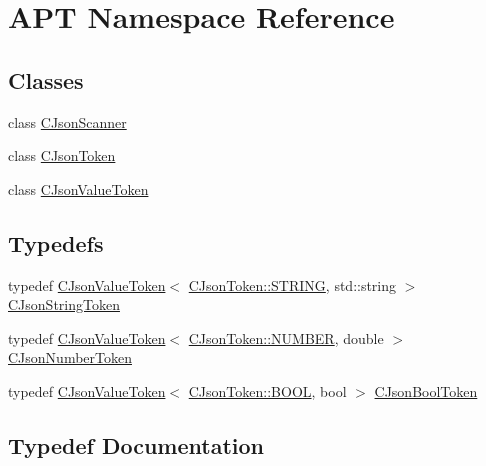\hypertarget{namespaceAPT}{}\section{A\+PT Namespace Reference}
\label{namespaceAPT}
\subsection*{Classes}
\begin{DoxyCompactItemize}
\item 
class \hyperlink{classAPT_1_1CJsonScanner}{C\+Json\+Scanner}
\item 
class \hyperlink{classAPT_1_1CJsonToken}{C\+Json\+Token}
\item 
class \hyperlink{classAPT_1_1CJsonValueToken}{C\+Json\+Value\+Token}
\end{DoxyCompactItemize}
\subsection*{Typedefs}
\begin{DoxyCompactItemize}
\item 
typedef \hyperlink{classAPT_1_1CJsonValueToken}{C\+Json\+Value\+Token}$<$ \hyperlink{classAPT_1_1CJsonToken_aab8edca6cac7d6c2cd4cb37ea0ab0dceab38d27c8c3b0aa088ce14682895b19d0}{C\+Json\+Token\+::\+S\+T\+R\+I\+NG}, std\+::string $>$ \hyperlink{namespaceAPT_a3af7abde9f907425ef65954a9b102083}{C\+Json\+String\+Token}
\item 
typedef \hyperlink{classAPT_1_1CJsonValueToken}{C\+Json\+Value\+Token}$<$ \hyperlink{classAPT_1_1CJsonToken_aab8edca6cac7d6c2cd4cb37ea0ab0dcea3113bd34020b4bff6e98c04ebc59cf1f}{C\+Json\+Token\+::\+N\+U\+M\+B\+ER}, double $>$ \hyperlink{namespaceAPT_aacc16da16d083aefa789bc0198b3effd}{C\+Json\+Number\+Token}
\item 
typedef \hyperlink{classAPT_1_1CJsonValueToken}{C\+Json\+Value\+Token}$<$ \hyperlink{classAPT_1_1CJsonToken_aab8edca6cac7d6c2cd4cb37ea0ab0dceabee35e13f6e1392c313da66ffe95564e}{C\+Json\+Token\+::\+B\+O\+OL}, bool $>$ \hyperlink{namespaceAPT_a6f531ac7001387df5b08e93d8f586000}{C\+Json\+Bool\+Token}
\end{DoxyCompactItemize}


\subsection{Typedef Documentation}
\mbox{\label{namespaceAPT_a6f531ac7001387df5b08e93d8f586000}} 
